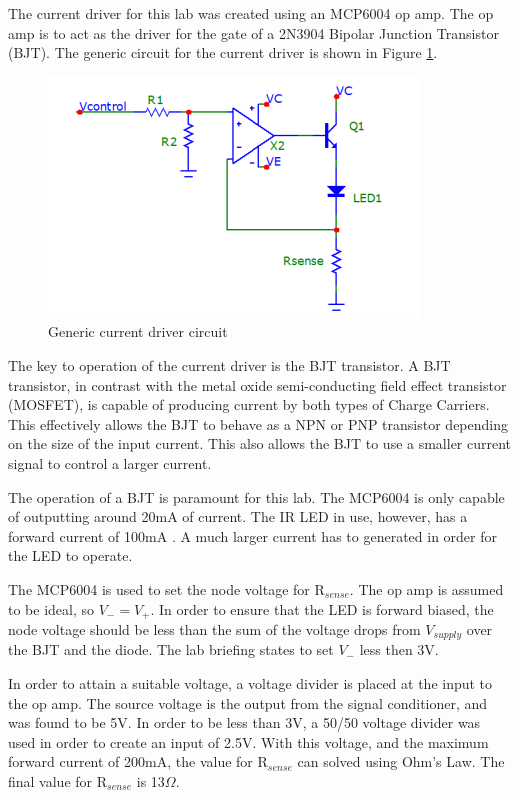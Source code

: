 
The current driver for this lab was created using an MCP6004 op amp. The op amp is to act as the driver for the gate of a 2N3904 Bipolar Junction Transistor (BJT). The generic circuit for the current driver is shown in Figure \ref{fig:currentgeneric}. 
	
	\begin{figure}[H]
		\centering
		\includegraphics[width=.6\textwidth]{CircuitDevelopment/ledgeneric.png}
		\caption{Generic current driver circuit \cite{b2}}
		\label{fig:currentgeneric}
	\end{figure}

The key to operation of the current driver is the BJT transistor. A BJT transistor, in contrast with the metal oxide semi-conducting field effect transistor (MOSFET), is capable of producing current by both types of Charge Carriers. This effectively allows the BJT to behave as a NPN or PNP transistor depending on the size of the input current. This also allows the BJT to use a smaller current signal to control a larger current. 

The operation of a BJT is paramount for this lab. The MCP6004 is only capable of outputting around 20mA of current. The IR LED in use, however, has a forward current of 100mA \cite{LEDDATASHEET}. A much larger current has to generated in order for the LED to operate. 

The MCP6004 is used to set the node voltage for R$_{sense}$. The op amp is assumed to be ideal, so $V_- = V_+$. In order to ensure that the LED is forward biased, the node voltage should be less than the sum of the voltage drops from $V_{supply}$ over the BJT and the diode. The lab briefing \cite{b2} states to set $V_-$ less then 3V.

In order to attain a suitable voltage, a voltage divider is placed at the input to the op amp. The source voltage is the output from the signal conditioner, and was found to be 5V. In order to be less than 3V, a 50/50 voltage divider was used in order to create an input of 2.5V. With this voltage, and the maximum forward current of 200mA, the value for R$_{sense}$ can solved using Ohm's Law. The final value for R$_{sense}$ is 13$\Omega$.

